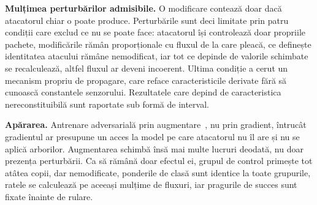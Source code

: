 \documentclass[11pt,a4paper]{article}
\begin{document}
\textbf{Mulțimea perturbărilor admisibile.} O modificare contează doar dacă atacatorul chiar
o poate produce. Perturbările sunt deci limitate prin patru condiții care exclud ce nu se poate face: 
atacatorul își controlează doar propriile pachete, modificările rămân
proporționale cu fluxul de la care pleacă, ce definește identitatea atacului rămâne nemodificat,
iar tot ce depinde de valorile schimbate se recalculează, altfel fluxul ar deveni incoerent.
Ultima condiție a cerut un mecanism propriu de propagare, care reface caracteristicile
derivate fără să cunoască constantele senzorului. Rezultatele care depind de
caracteristica nereconstituibilă sunt raportate sub formă de interval.

\textbf{Apărarea.} Antrenare adversarială prin augmentare~\cite{goodfellow2015explaining,
madry2018towards}, nu prin gradient, întrucât gradientul ar presupune un acces la model pe
care atacatorul nu îl are și nu se aplică arborilor. Augmentarea schimbă însă mai multe lucruri
deodată, nu doar prezența perturbării. Ca să rămână doar efectul ei, grupul de control
primește tot atâtea copii, dar nemodificate, ponderile de clasă sunt identice la toate
grupurile, ratele se calculează pe aceeași mulțime de fluxuri, iar pragurile de succes sunt
fixate înainte de rulare.
\end{document}
